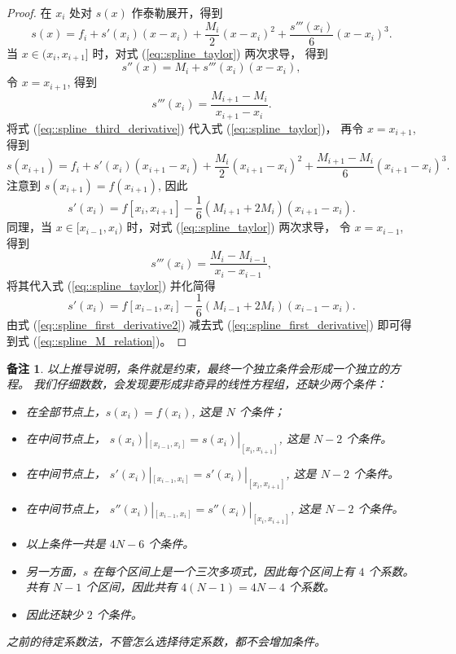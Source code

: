 \documentclass[a4paper]{ctexart}
\newtheorem*{remark*}{备注}
\numberwithin{theorem}{section}
\numberwithin{equation}{section}
\numberwithin{figure}{section}
\numberwithin{remark}{section}
\begin{document}
\begin{proof}
在 $x_i$ 处对 $s(x)$ 作泰勒展开，得到
\begin{equation}
    \label{eq::spline_taylor}
s(x)=f_i+s'(x_i)(x-x_i)+\frac{M_i}{2}(x-x_i)^2+\frac{s'''(x_i)}{6}(x-x_i)^3.
\end{equation}
当 $x\in(x_i,x_{i+1}]$ 时，对式 (\ref{eq::spline_taylor}) 两次求导，
得到
\[
s''(x) = M_i + s'''(x_i)(x - x_i),
\]
令 $x=x_{i+1}$, 得到
\begin{equation}
    \label{eq::spline_third_derivative}
s'''(x_i)=\frac{M_{i+1}-M_i}{x_{i+1}-x_i}.
\end{equation}
将式 (\ref{eq::spline_third_derivative}) 代入式 (\ref{eq::spline_taylor})，
再令 $x=x_{i+1}$, 得到
\[
s(x_{i+1}) 
= f_i + s'(x_i)(x_{i+1} - x_i) 
+ \frac{M_i}{2}(x_{i+1} - x_i)^2 + \frac{M_{i+1} - M_i}{6}(x_{i+1} - x_i)^3.
\]
注意到 $s(x_{i + 1}) = f(x_{i + 1})$, 因此
\begin{equation}
    \label{eq::spline_first_derivative}
s'(x_i)=f[x_i,x_{i+1}]-\frac{1}{6}(M_{i+1}+2M_i)(x_{i+1}-x_i).
\end{equation}
同理，当 $x\in[x_{i-1},x_i)$ 时，对式 (\ref{eq::spline_taylor}) 两次求导，
令 $x=x_{i-1}$, 得到
\begin{equation*}
s'''(x_i)=\frac{M_i-M_{i-1}}{x_i-x_{i-1}},
\end{equation*}
将其代入式 (\ref{eq::spline_taylor}) 并化简得
\begin{equation}
    \label{eq::spline_first_derivative2}
s'(x_i)=f[x_{i-1},x_i]-\frac{1}{6}(M_{i-1}+2M_i)(x_{i-1}-x_i).
\end{equation}
由式 (\ref{eq::spline_first_derivative2}) 
减去式 (\ref{eq::spline_first_derivative}) 
即可得到式 (\ref{eq::spline_M_relation})。
\end{proof}

\begin{remark*}
    以上推导说明，条件就是约束，最终一个独立条件会形成一个独立的方程。
    我们仔细数数，会发现要形成非奇异的线性方程组，还缺少两个条件：
    \begin{itemize}
    \item 在全部节点上，$s(x_i)=f(x_i)$, 这是 $N$ 个条件；
    \item 在中间节点上，
    $s(x_i)|_{[x_{i - 1}, x_{i}]} = s(x_i)|_{[x_i, x_{i + 1}]}$, 
    这是 $N-2$ 个条件。
    \item 在中间节点上，
    $s'(x_i)|_{[x_{i - 1}, x_{i}]} = s'(x_i)|_{[x_i, x_{i + 1}]}$,
    这是 $N-2$ 个条件。
    \item 在中间节点上，
    $s''(x_i)|_{[x_{i - 1}, x_{i}]} = s''(x_i)|_{[x_i, x_{i + 1}]}$,
    这是 $N-2$ 个条件。
    \item 以上条件一共是 $4N - 6$ 个条件。
    \item 另一方面，$s$ 在每个区间上是一个三次多项式，因此每个区间上有 $4$ 个系数。
    共有 $N-1$ 个区间，因此共有 $4(N-1) = 4N - 4$ 个系数。
    \item 因此还缺少 $2$ 个条件。
    \end{itemize}
    \item 之前的待定系数法，不管怎么选择待定系数，都不会增加条件。
\end{remark*}
\end{document}
